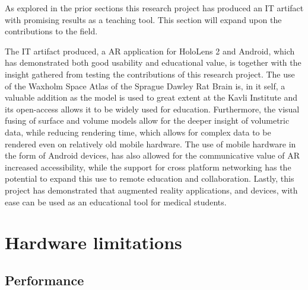 As explored in the prior sections this research project has produced an IT artifact with promising results as a teaching tool. This section will expand upon the contributions to the field.

The IT artifact produced, a AR application for HoloLens 2 and Android, which has demonstrated both good usability and educational value, is  together with the insight gathered from testing the contributions of this research project. 
The use of the Waxholm Space Atlas of the Sprague Dawley Rat Brain is, in it self, a valuable addition as the model is used to great extent at the Kavli Institute and its open-access allows it to be widely used for education. Furthermore, the visual fusing of surface and volume models allow for the deeper insight of volumetric data, while reducing rendering time, which allows for complex data to be rendered even on relatively old mobile hardware. The use of mobile hardware in the form of Android devices, has also allowed for the communicative value of AR increased accessibility, while the support for cross platform networking has the potential to expand this use to remote education and collaboration. Lastly, this project has demonstrated that augmented reality applications, and devices, with ease can be used as an educational tool for medical students.




\section{Hardware limitations}

\subsection{Performance}\label{chap:discussperformance}

